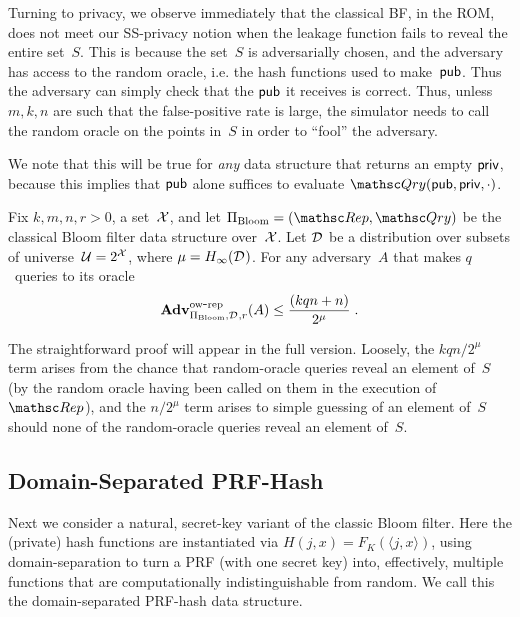 Turning to privacy, we observe immediately that the classical BF, in the
ROM, does not meet our SS-privacy notion when the leakage function
fails to reveal the entire set~$S$.  This is because the set~$S$ is
adversarially chosen, and the adversary has access to the random
oracle, i.e. the hash functions used to make~${\sf pub}$.  Thus the
adversary can simply check that the ${\sf pub}$ it receives is correct.
Thus, unless $m,k,n$ are such that the false-positive rate is large,
the simulator needs to call the random oracle on the points in~$S$ in order to ``fool'' the adversary.

We note that this will be true for \emph{any} data structure that returns an empty ${\sf priv}$, because this implies that ${\sf pub}$ alone suffices to evaluate $\Qry(\pubaux,\privaux,\cdot)$.

\begin{theorem}\label{thm3}\label{thm:bf-ow}
Fix $k,m,n,r>0$, a set~${\cal X}$, and let $\setprim_{\mathrm{Bloom}}= (\Rep, \Qry)$ be the classical Bloom filter data structure over~${\cal X}$. Let $\mathcal{D}_{}^{}$ be a distribution over subsets of universe~${\cal U}=2^{\cal X}$, where $\mu = H_\infty(\mathcal{D}_{}^{})$.  For any adversary~$A$ that makes $q$~queries to its oracle
\[
\mathrm{\mathbf{Adv}}^{\mathrm{ow\mbox{-}rep}}_{\Pi_{\mathrm{Bloom}},\mathcal{D}_{}^{},r}(A) \leq  \frac{(kqn+n)}{2^{\mu}}\;.
\]
\end{theorem}
The straightforward proof will appear in the full version.
Loosely, the $kqn/2^{\mu}$ term arises from the chance that random-oracle queries reveal an element of~$S$ (by the random oracle having
been called on them in the execution of~$\Rep$), and the $n/2^\mu$
term arises to simple guessing of an element of~$S$ should none of the
random-oracle queries reveal an element of~$S$.


\subsection{Domain-Separated PRF-Hash}
Next we consider a natural, secret-key variant of the classic Bloom
filter.  Here the (private) hash functions are instantiated via
$H(j,x)=F_K(\langle j,x\rangle)$, using domain-separation to turn a
PRF (with one secret key) into, effectively, multiple functions that
are computationally indistinguishable from random.  We call this the
domain-separated PRF-hash data structure.

